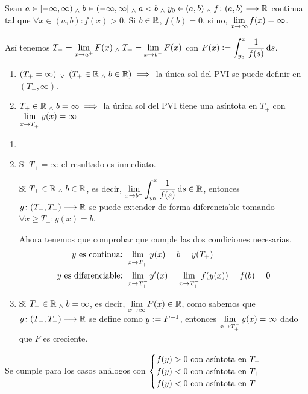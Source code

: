 \begin{teo}
	Sean $a\in [-\infty, \infty) \; _{\wedge} \; b\in (-\infty, \infty] \; _{\wedge} \; a < b \; _{\wedge} \; y_0 \in (a, b) \; _{\wedge} \; f \colon (a,b) \longrightarrow \mathbb{R}$ continua tal que $\forall x \in (a, b) : f(x) > 0$. Si $b \in \mathbb{R}$, $f(b)=0$, si no, $\displaystyle \lim_{x\to\infty} f(x) = \infty$.

	Así tenemos $\displaystyle T_-=\lim_{x\to a^+} F(x) \; _{\wedge} \; T_+=\lim_{x\to b^-} F(x)$ con $\ds F(x)\defeq\int_{y_0}^{x} \frac{1}{f(s)}\odif{s}$.
	\begin{enumerate}
		\item $\left(T_+ = \infty\right) \; _{\vee} \; \left(T_+ \in \mathbb{R} \; _{\wedge} \; b \in \mathbb{R}\right) \implies$ la única sol del PVI se puede definir en $(T_-, \infty)$.
		\item $T_+ \in \mathbb{R} \; _{\wedge} \; b = \infty \implies$ la única sol del PVI tiene una asíntota en $T_+$ con $\displaystyle \lim_{x\to T_+^-} y(x) = \infty$
	\end{enumerate}
	\begin{dem}
		\begin{enumerate}
			\item[]
			\item Si $T_+ = \infty$ el resultado es inmediato.

			      Si $T_+ \in \mathbb{R} \; _{\wedge} \; b \in \mathbb{R}$, es decir, $\ds \lim_{x\to b^-} \int_{y_0}^{x} \frac{1}{f(s)} \odif{s} \in \R$, entonces $y \colon (T_-, T_+) \longrightarrow \mathbb{R}$ se puede extender de forma diferenciable tomando $\forall x \geq T_+ : y(x)=b$.

			      Ahora tenemos que comprobar que cumple las dos condiciones necesarias.
			      \[\begin{aligned}
					      y \text{ es continua: }      & \lim_{x\to T_+^-} y(x) = b = y(T_+)                            \\
					      y \text{ es diferenciable: } & \lim_{x\to T_+^-} y'(x) = \lim_{x\to T_+^-} f(y(x)) = f(b) = 0
				      \end{aligned}\]
			\item Si $T_+ \in \mathbb{R} \; _{\wedge} \; b = \infty$, es decir, $\displaystyle \lim_{x\to\infty} F(x) \in \mathbb{R}$, como sabemos que $y \colon (T_-, T_+) \longrightarrow \mathbb{R}$ se define como $y\vcentcolon= F^{-1}$, entonces $\displaystyle \lim_{x\to T_+^-} y(x) = \infty$ dado que $F$ es creciente.
		\end{enumerate}
	\end{dem}
\end{teo}

\begin{obs}
	Se cumple para los casos análogos con $\begin{cases}
			f(y) > 0 \text{ con asíntota en } T_- \\
			f(y) < 0 \text{ con asíntota en } T_+ \\
			f(y) < 0 \text{ con asíntota en } T_- \\
		\end{cases}$
\end{obs}
\pagebreak
{}
